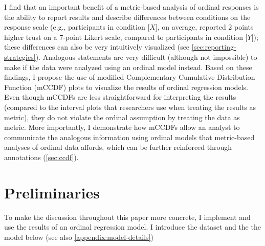 \documentclass{vgtc}                          %
\newcommand{\ccdf}[1]{mCCDF#1}
\begin{document}
I find that an important benefit of a metric-based analysis of ordinal responses is the ability to report results and describe differences between conditions on the response scale (e.g., participants in condition [$X$], on average, reported 2 points higher trust on a 7-point Likert scale, compared to participants in condition [$Y$]); these differences can also be very intuitively visualized (see \autoref{sec:reporting-strategies}). Analogous statements are very difficult (although not impossible) to make if the data were analyzed using an ordinal model instead. Based on these findings, I propose the use of modified Complementary Cumulative Distribution Function (\ccdf) plots to visualize the results of ordinal regression models. Even though \ccdf{s} are less straightforward for interpreting the results (compared to the interval plots that researchers use when treating the results as metric), they do not violate the ordinal assumption by treating the data as metric. More importantly, I demonstrate how \ccdf{s} allow an analyst to communicate the analogous information using ordinal models that metric-based analyses of ordinal data affords, which can be further reinforced through annotations (\autoref{sec:ccdf}).

\section{Preliminaries}
To make the discussion throughout this paper more concrete, I implement and use the results of an ordinal regression model. I introduce the dataset and the the model below (see also \autoref{appendix:model-details})

\vspace{-2pt}
\end{document}
